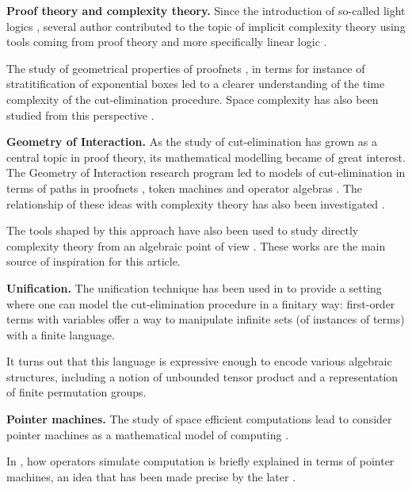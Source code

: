 \textbf{Proof theory and complexity theory.} Since the introduction of so-called light logics \cite{girard_light_1994}, several author contributed to the topic of implicit complexity theory using tools coming from proof theory and more specifically linear logic \cite{girard_linear_1987}.

The study of geometrical properties of proofnets \cite{girard_proof-nets:_1996}, in terms for instance of stratitification of exponential boxes \cite{baillot_linear_2010} led to a clearer understanding of the time complexity of the cut-elimination procedure. Space complexity has also been studied from this perspective \cite{schopp_stratified_2007,gaboardi_logical_2008}.

\smallskip\noindent
\textbf{Geometry of Interaction.} As the study of cut-elimination has grown as a central topic in proof theory, its mathematical modelling became of great interest. The Geometry of Interaction \cite{girard_towards_1989} research program led to models of cut-elimination in terms of paths in proofnets \cite{asperti_paths_1994}, token machines \cite{laurent_token_2001} and operator algebras \cite{girard_geometry_1989,girard_geometry_1988,girard_geometry_2005}. The relationship of these ideas with complexity theory has also been investigated \cite{schopp_space-efficient_2006,baillot_elementary_2001}.

The tools shaped by this approach have also been used to study directly complexity theory from an algebraic point of view \cite{girard_normativity_2012,aubert_characterizing_2012,seiller_logarithmic_2013}. These works are the main source of inspiration for this article.

\smallskip\noindent
\textbf{Unification.} The unification technique has been used in \cite{girard_geometry_1995,baillot_elementary_2001} to provide a setting where one can model the cut-elimination procedure in a finitary way: first-order terms with variables offer a way to manipulate infinite sets (of instances of terms) with a finite language.

It turns out that this language is expressive enough to encode various algebraic structures, including a notion of unbounded tensor product and a representation of finite permutation groups.

\smallskip\noindent
\textbf{Pointer machines.} The study of space efficient computations lead to consider pointer machines as a mathematical model of computing \cite{hofmann_pointer_2009,hofmann_pure_2010}.

In \cite{girard_normativity_2012}, how operators simulate computation is briefly explained in terms of pointer machines, an idea that has been made precise by the later \cite{aubert_characterizing_2012,seiller_logarithmic_2013}.

